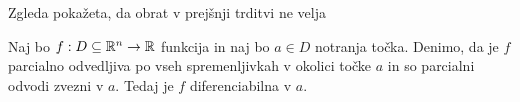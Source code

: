 \begin{opomba}
    Zgleda pokažeta, da obrat v prejšnji trditvi ne velja
\end{opomba}

\begin{izrek}
    Naj bo $f: D \subseteq \mathbb{R}^n \to \mathbb{R}$ funkcija in naj bo $a \in D$ notranja točka. Denimo, da je $f$ parcialno odvedljiva po vseh spremenljivkah v okolici točke $a$ in so parcialni odvodi zvezni v $a$. Tedaj je $f$ diferenciabilna v $a$.
\end{izrek}